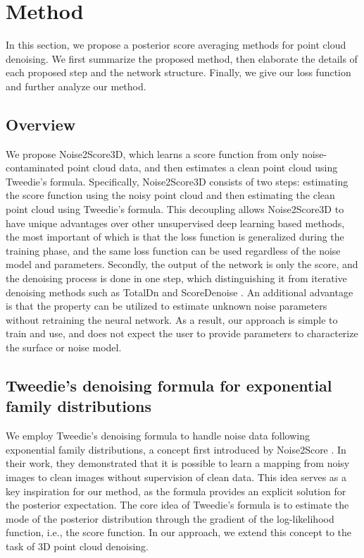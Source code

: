 \section{Method}
\label{sec:method}
In this section, we propose a posterior score averaging methods for point cloud denoising. We first summarize the proposed method, then elaborate the details of each proposed step and the network structure. Finally, we give our loss function and further analyze our method.
    \subsection{Overview}
We propose Noise2Score3D, which learns a score function from only noise-contaminated point cloud data, and then estimates a clean point cloud using Tweedie's formula. Specifically, Noise2Score3D consists of two steps: estimating the score function using the noisy point cloud and then estimating the clean point cloud using Tweedie's formula.
This decoupling allows Noise2Score3D to have unique advantages over other unsupervised deep learning based methods, the most important of which is that the loss function is generalized during the training phase, and the same loss function can be used regardless of the noise model and parameters. Secondly, the output of the network is only the score, and the denoising process is done in one step, which distinguishing it from iterative denoising methods such as TotalDn \cite{hermosilla2019TotalDenoising} and ScoreDenoise \cite{luo_score-based_2021}. An additional advantage is that the property can be utilized to estimate unknown noise parameters without retraining the neural network.  As a result, our approach is simple to train and use, and does not expect the user to provide parameters to characterize the surface or noise model.
    \subsection{Tweedie's denoising formula for exponential family distributions}
    \label{secTweedie'sformula}
We employ Tweedie’s denoising formula to handle noise data following exponential family distributions, a concept first introduced by Noise2Score \cite{noise2score2021}. In their work, they demonstrated that it is possible to learn a mapping from noisy images to clean images without supervision of clean data. This idea serves as a key inspiration for our method, as the formula provides an explicit solution for the posterior expectation. The core idea of Tweedie’s formula is to estimate the mode of the posterior distribution through the gradient of the log-likelihood function, i.e., the score function. In our approach, we extend this concept to the task of 3D point cloud denoising.

